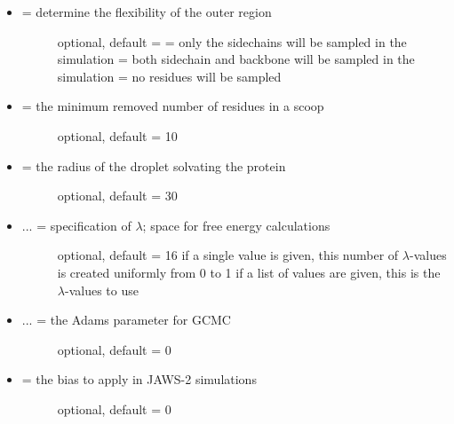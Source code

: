 \documentclass[letterpaper,10pt,english]{manual}
\begin{document}
\begin{itemize}
\begin{description}
\end{description}

\item {} \begin{description}
\item[{ = determine the flexibility of the outer region}] \leavevmode
optional, default = 
 = only the sidechains will be sampled in the simulation
 = both sidechain and backbone will be sampled in the simulation
 = no residues will be sampled

\end{description}

\item {} \begin{description}
\item[{ = the minimum removed number of residues in a scoop}] \leavevmode
optional, default = 10

\end{description}

\item {} \begin{description}
\item[{ = the radius of the droplet solvating the protein}] \leavevmode
optional, default = 30

\end{description}

\item {} \begin{description}
\item[{ ... = specification of $\lambda$; space for free energy calculations}] \leavevmode
optional, default = 16
if a single value is given, this number of $\lambda$-values is created uniformly from 0 to 1
if a list of values are given, this is the $\lambda$-values to use

\end{description}

\item {} \begin{description}
\item[{ ... = the Adams parameter for GCMC}] \leavevmode
optional, default = 0

\end{description}

\item {} \begin{description}
\item[{ = the bias to apply in JAWS-2 simulations}] \leavevmode
optional, default = 0


\end{description}
\end{itemize}
\end{document}
